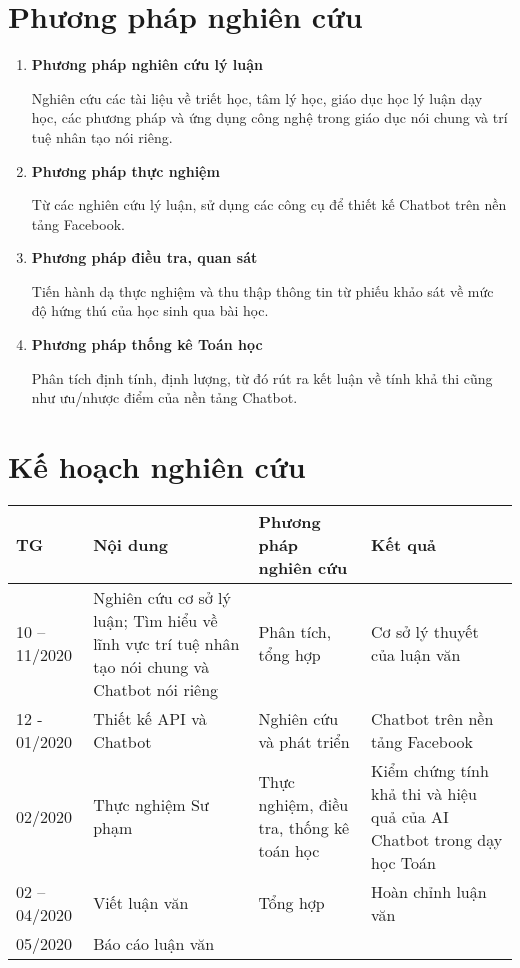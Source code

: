 \section{Phương pháp nghiên cứu}
\begin{enumerate}[label=\textbf{\thesection.\arabic*.},align=left,left=0cm..1cm]
	\item \textbf{Phương pháp nghiên cứu lý luận}\par
	Nghiên cứu các tài liệu về triết học, tâm lý học, giáo dục học lý luận dạy học, các phương pháp và ứng dụng công nghệ trong giáo dục nói chung và trí tuệ nhân tạo nói riêng.
	\item \textbf{Phương pháp thực nghiệm} \par
	Từ các nghiên cứu lý luận, sử dụng các công cụ để thiết kế Chatbot trên nền tảng Facebook.
	\item \textbf{Phương pháp điều tra, quan sát} \par
	Tiến hành dạ thực nghiệm và thu thập thông tin từ phiếu khảo sát về mức độ hứng thú của học sinh qua bài học.
	\item \textbf{Phương pháp thống kê Toán học} \par
	Phân tích định tính, định lượng, từ đó rút ra kết luận về tính khả thi cũng như ưu/nhược điểm của nền tảng Chatbot.
\end{enumerate}

\section{Kế hoạch nghiên cứu}
\begin{tabular}{|p{.1\linewidth}|p{.35\linewidth}|p{.2\linewidth}|p{.25\linewidth}|}
	\hline
	\textbf{TG} & \textbf{Nội dung} & \textbf{Phương pháp nghiên cứu} & \textbf{Kết quả} \\
	\hline
	10 – 11/2020 & Nghiên cứu cơ sở lý luận; Tìm hiểu về lĩnh vực trí tuệ nhân tạo nói chung và Chatbot nói riêng & Phân tích, tổng hợp & Cơ sở lý thuyết của luận văn \\
	\hline
	12 - 01/2020 & Thiết kế API và Chatbot & Nghiên cứu và phát triển & Chatbot trên nền tảng Facebook \\
	\hline
	02/2020 & Thực nghiệm Sư phạm & Thực nghiệm, điều tra, thống kê toán học & Kiểm chứng tính khả thi và hiệu quả của AI Chatbot trong dạy học Toán \\
	\hline
	02 – 04/2020 & Viết luận văn & Tổng hợp & Hoàn chỉnh luận văn \\
	\hline
	05/2020 & Báo cáo luận văn & & \\
	\hline
\end{tabular}
